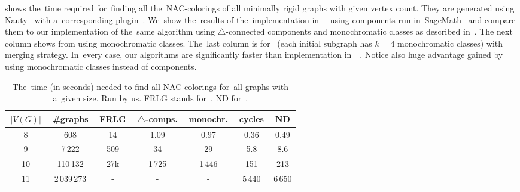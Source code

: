 shows the~time required for~finding all the~NAC-colorings
of all minimally rigid graphs with given vertex count.
%
They are generated using Nauty~\cite{nauty}
with a~corresponding plugin~\cite{nauty_plugin}.
%
We~show the~results of the~implementation
in~\flexrilog{}~\cite{flexrilog} using \trcon{} components
run in~SageMath~\cite{sagemath}
and compare them to our implementation of the~same \Naive{} algorithm
using $\triangle$-connected components
and monochromatic classes as described in~.
The next column shows \NaiveCycles{} from 
using monochromatic classes.
The~last column is for~\NeighborsDegree{} (each initial subgraph has $k=4$ monochromatic classes)
with \MergeLinear{} merging strategy.
%
In~every case, our algorithms are significantly faster than implementation in~\flexrilog{}~\cite{flexrilog}.
Notice also huge advantage gained by using monochromatic classes instead of \trcon{} components.
%
\begin{table}[ht]
	\caption[Running times on graphs]{
		The~time (in seconds) needed to find all NAC-colorings for~all graphs with a~given size. Run by us.
		\textsc{FRLG} stands for~\flexrilog{}, \textsc{ND} for~\NeighborsDegree{}.}%
	\label{tab:all_min_rigid}
	\centering
	\begin{tabular}{ccccccc}
		\hline
		\,$|V(G)|$\, & \,\#graphs\, & \,FRLG\, & \,$\triangle$-comps.\, & \,monochr.\, & \,cycles\, & \,\textsc{ND}\, \\
		\hline
		8            & 608          & 14       & 1.09                   & 0.97         & 0.36       & 0.49            \\
		9            & 7\,222       & 509      & 34                     & 29           & 5.8        & 8.6             \\
		10           & 110\,132     & 27k      & 1\,725                 & 1\,446       & 151        & 213             \\
		11           & 2\,039\,273  & -        & -                      & -            & 5\,440     & 6\,650          \\
		\hline
	\end{tabular}
\end{table}

